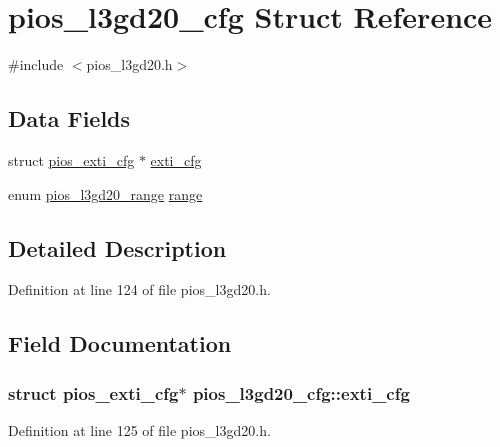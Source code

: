 \hypertarget{structpios__l3gd20__cfg}{\section{pios\-\_\-l3gd20\-\_\-cfg \-Struct \-Reference}
\label{structpios__l3gd20__cfg}
}


{\ttfamily \#include $<$pios\-\_\-l3gd20.\-h$>$}

\subsection*{\-Data \-Fields}
\begin{DoxyCompactItemize}
\item 
struct \hyperlink{structpios__exti__cfg}{pios\-\_\-exti\-\_\-cfg} $\ast$ \hyperlink{structpios__l3gd20__cfg_a7b77b9fb8ef5db1018c7c4d4edd42de7}{exti\-\_\-cfg}
\item 
enum \hyperlink{group___p_i_o_s___l3_g_d20_ga704696d385abb591516d2e31301dad66}{pios\-\_\-l3gd20\-\_\-range} \hyperlink{structpios__l3gd20__cfg_acc8d8efddd5b48a7febd54c5a4c5cb4b}{range}
\end{DoxyCompactItemize}


\subsection{\-Detailed \-Description}


\-Definition at line 124 of file pios\-\_\-l3gd20.\-h.



\subsection{\-Field \-Documentation}
\hypertarget{structpios__l3gd20__cfg_a7b77b9fb8ef5db1018c7c4d4edd42de7}{
\subsubsection[{exti\-\_\-cfg}]{\setlength{\rightskip}{0pt plus 5cm}struct {\bf pios\-\_\-exti\-\_\-cfg}$\ast$ {\bf pios\-\_\-l3gd20\-\_\-cfg\-::exti\-\_\-cfg}}}\label{structpios__l3gd20__cfg_a7b77b9fb8ef5db1018c7c4d4edd42de7}


\-Definition at line 125 of file pios\-\_\-l3gd20.\-h.

